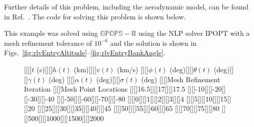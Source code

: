 \documentclass[10pt]{article}
\newenvironment{shadedframe}{%
  \def\FrameCommand{\fcolorbox{black}{shadecolor}}%
  \MakeFramed {\FrameRestore}}
{\endMakeFramed}
\begin{document}
Further details of this problem, including the aerodynamic model, can
be found in Ref.~.  The code for solving this problem is
shown below.  
\begin{shadedframe}



\end{shadedframe} 
This example was solved using $\mathbb{GPOPS-II}$ using the NLP solver
IPOPT with a mesh refinement tolerance of $10^{-6}$ and the solution
is shown in
Figs.~\ref{fig:rlvEntryAltitude}--\ref{fig:rlvEntryBankAngle}.  
\begin{figure}[h]
\vspace*{-0.4in}
\psfragscanon
{}[][]{\footnotesize$t$ (s)}[][]{\footnotesize$h(t)$ (km)}[][]{\footnotesize$v(t)$ (km/s)}
[][]{\footnotesize$\phi(t)$ (deg)}[][]{\footnotesize$\theta(t)$ (deg)}[][]{\footnotesize$\gamma(t)$ (deg)}
[][]{\footnotesize$\alpha(t)$ (deg)}[][]{\footnotesize$\sigma(t)$ (deg)}
[][]{\footnotesize Mesh Refinement Iteration}
[][]{\footnotesize Mesh Point Locations} 
[][]{\footnotesize 16.5}[][]{\footnotesize 17}[][]{\footnotesize 17.5}
[][]{\footnotesize -10}[][]{\footnotesize -20}[][]{\footnotesize -30}[][]{\footnotesize -40}
[][]{\footnotesize -50}[][]{\footnotesize -60}[][]{\footnotesize -70}[][]{\footnotesize -80}
[][]{\footnotesize 0}[][]{\footnotesize 1}[][]{\footnotesize 2}[][]{\footnotesize 3}[][]{\footnotesize 4}
[][]{\footnotesize 5}[][]{\footnotesize 10}[][]{\footnotesize 15}[][]{\footnotesize 20}
[][]{\footnotesize 25}[][]{\footnotesize 30}[][]{\footnotesize 35}[][]{\footnotesize 40}[][]{\footnotesize 45}
[][]{\footnotesize 50}[][]{\footnotesize 55}[][]{\footnotesize 60}[][]{\footnotesize 65}
[][]{\footnotesize 70}[][]{\footnotesize 75}[][]{\footnotesize 80}
[][]{\footnotesize 500}[][]{\footnotesize 1000}[][]{\footnotesize 1500}[][]{\footnotesize 2000}

\end{figure}
\end{document}
